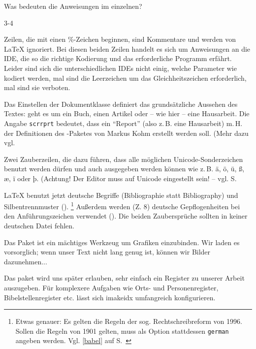 Was bedeuten die Anweisungen im einzelnen?

\begin{labeling}{3-4}

 \item[1-2] Zeilen, die mit einen \%-Zeichen beginnen, sind Kommentare und
   werden von \LaTeX{} ignoriert. Bei diesen beiden Zeilen handelt es sich
   um Anweisungen an die IDE, die so die richtige Kodierung und das
   erforderliche Programm erfährt.  Leider sind sich die unterschiedlichen
   IDEs nicht einig, welche Parameter wie kodiert werden, mal sind die
   Leerzeichen um das Gleichheitszeichen erforderlich, mal sind sie
   verboten.

 \item[3] Das Einstellen der Dokumentklasse definiert das grundsätzliche
   Aussehen des Textes: geht es um ein Buch, einen Artikel oder -- wie hier
   -- eine Hausarbeit.  Die Angabe \lstinline/scrrprt/ bedeutet, dass ein
   \enquote{Report} (also z.\,B. eine Hausarbeit) m.\,H. der Definitionen
   des \KOMAScript-Paketes von Markus Kohm erstellt werden soll.  (Mehr dazu
   vgl. \pageref{komaskript}
 
 \item[5-6] Zwei Zauberzeilen, die dazu führen, dass alle möglichen
   Unicode-Sonderzeichen benutzt werden dürfen und auch ausgegeben werden
   können wie z.\,B. ä, ö, ü, ß, æ, ï oder þ.  (Achtung! Der Editor muss auf
   Unicode eingestellt sein! -- vgl. S.~\pageref{unicode}
 
 \item[8-9] \LaTeX{} benutzt jetzt deutsche Begriffe (Bibliographie statt
   Bibliography) und Silbentrennmuster ().  \footnote{Etwas
   genauer: Es gelten die Regeln der sog. Rechtschreibreform von 1996.
   Sollen die Regeln von 1901 gelten, muss als Option stattdessen
   \lstinline/german/ angeben werden. Vgl. \ref{babel} auf
   S.~\pageref{babel}} Außerdem werden (Z. 8) deutsche Gepflogenheiten bei
   den Anführungszeichen verwendet ().  Die beiden
   Zaubersprüche sollten in keiner deutschen Datei fehlen.
 
 \item[11] Das Paket  ist ein mächtiges Werkzeug um Grafiken
   einzubinden.  Wir laden es vorsorglich; wenn unser Text nicht lang genug
   ist, können wir Bilder dazunehmen...
 
 \item[12] Das paket  wird uns später erlauben, sehr einfach
   ein Register zu unserer Arbeit auszugeben.  Für komplexere Aufgaben wie
   Orts- und Personenregister, Bibelstellenregister etc. lässt sich imakeidx
   umfangreich konfigurieren.
 

\end{labeling}
